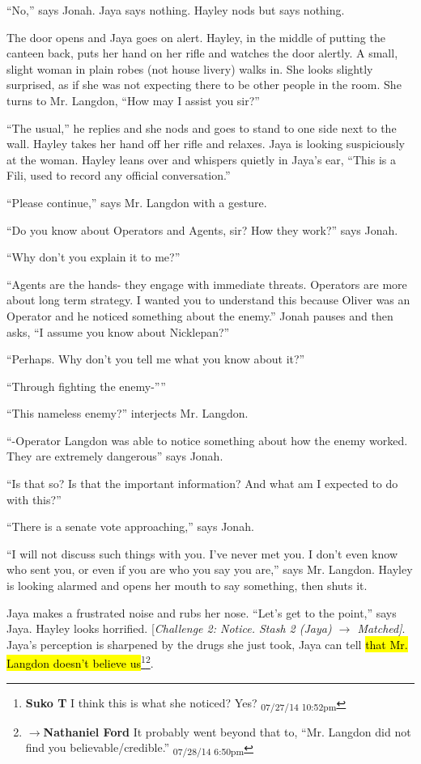 ``No,'' says Jonah.  Jaya says nothing.  Hayley nods but says nothing.

The door opens and Jaya goes on alert.  Hayley, in the middle of putting the canteen back, puts her hand on her rifle and watches the door alertly.  A small, slight woman in plain robes (not house livery) walks in.  She looks slightly surprised, as if she was not expecting there to be other people in the room.  She turns to Mr. Langdon, ``How may I assist you sir?''

``The usual,'' he replies and she nods and goes to stand to one side next to the wall.  Hayley takes her hand off her rifle and relaxes.  Jaya is looking suspiciously at the woman.  Hayley leans over and whispers quietly in Jaya's ear, ``This is a Fili, used to record any official conversation.''

``Please continue,'' says Mr. Langdon with a gesture.

``Do you know about Operators and Agents, sir?  How they work?'' says Jonah.

``Why don't you explain it to me?''

``Agents are the hands- they engage with immediate threats.  Operators are more about long term strategy.   I wanted you to understand this because Oliver was an Operator and he noticed something about the enemy.''  Jonah pauses and then asks, ``I assume you know about Nicklepan?''

``Perhaps.  Why don't you tell me what you know about it?''

``Through fighting the enemy-''''

``This nameless enemy?'' interjects Mr. Langdon.

``-Operator Langdon was able to notice something about how the enemy worked.  They are extremely dangerous'' says Jonah.  

``Is that so?  Is that the important information?  And what am I expected to do with this?''

``There is a senate vote approaching,'' says Jonah.

``I will not discuss such things with you.  I've never met you.  I don't even know who sent you, or even if you are who you say you are,'' says Mr. Langdon.  Hayley is looking alarmed and opens her mouth to say something, then shuts it.

Jaya makes a frustrated noise and rubs her nose.  ``Let's get to the point,'' says Jaya.  Hayley looks horrified.  {[}\textit{Challenge 2:  Notice.  Stash 2 (Jaya) $\rightarrow$ Matched{]}}.  Jaya's perception is sharpened by the drugs she just took, Jaya can tell \hl{that Mr. Langdon doesn't believe us}\footnote{\textbf{Suko T }I think this is what she noticed?  Yes? \textsubscript{07/27/14 10:52pm}}\footnote{$\rightarrow$\textbf{Nathaniel Ford }It probably went beyond that to, ``Mr. Langdon did not find you believable/credible.'' \textsubscript{07/28/14 6:50pm}}.

